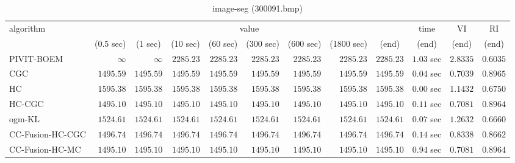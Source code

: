 \begin{table}[H]
\scriptsize
\centering
\caption{image-seg (300091.bmp)}
\label{tab:anytimetable-image-seg-300091.bmp}
\begin{tabular}{lrrrrrrrrrrr}
\toprule
           algorithm &                                   \multicolumn{8}{c}{value} & \multicolumn{1}{c}{time}    & \multicolumn{1}{c}{VI}  & \multicolumn{1}{c}{RI} \\  
\cmidrule(lr){2-9}\cmidrule(lr){10-10} \cmidrule(lr){11-11} \cmidrule(lr){12-12}   
                     & \multicolumn{1}{c}{(0.5 sec)} & \multicolumn{1}{c}{(1 sec)} & \multicolumn{1}{c}{(10 sec)} & \multicolumn{1}{c}{(60 sec)} & \multicolumn{1}{c}{(300 sec)} & \multicolumn{1}{c}{(600 sec)} & \multicolumn{1}{c}{(1800 sec)} & \multicolumn{1}{c}{(end)} & \multicolumn{1}{c}{(end)}    & \multicolumn{1}{c}{(end)}   & \multicolumn{1}{c}{(end)}  \\ \midrule 
          PIVIT-BOEM & $\infty$ & $\infty$ & $      2285.23$ & $      2285.23$ & $      2285.23$ & $      2285.23$ & $      2285.23$ & $      2285.23$ & $         1.03$ sec    & $       2.8335$  & $       0.6035$ \\ 
                 CGC & $      1495.59$ & $      1495.59$ & $      1495.59$ & $      1495.59$ & $      1495.59$ & $      1495.59$ & $      1495.59$ & $      1495.59$ & $         0.04$ sec    & $       0.7039$  & $       0.8965$ \\ 
                  HC & $      1595.38$ & $      1595.38$ & $      1595.38$ & $      1595.38$ & $      1595.38$ & $      1595.38$ & $      1595.38$ & $      1595.38$ & $         0.00$ sec    & $       1.1432$  & $       0.6750$ \\ 
              HC-CGC & $      1495.10$ & $      1495.10$ & $      1495.10$ & $      1495.10$ & $      1495.10$ & $      1495.10$ & $      1495.10$ & $      1495.10$ & $         0.11$ sec    & $       0.7081$  & $       0.8964$ \\ 
              ogm-KL & $      1524.61$ & $      1524.61$ & $      1524.61$ & $      1524.61$ & $      1524.61$ & $      1524.61$ & $      1524.61$ & $      1524.61$ & $         0.07$ sec    & $       1.2632$  & $       0.6660$ \\ 
    CC-Fusion-HC-CGC & $      1496.74$ & $      1496.74$ & $      1496.74$ & $      1496.74$ & $      1496.74$ & $      1496.74$ & $      1496.74$ & $      1496.74$ & $         0.14$ sec    & $       0.8338$  & $       0.8662$ \\ 
     CC-Fusion-HC-MC & $      1495.10$ & $      1495.10$ & $      1495.10$ & $      1495.10$ & $      1495.10$ & $      1495.10$ & $      1495.10$ & $      1495.10$ & $         0.94$ sec    & $       0.7081$  & $       0.8964$ \\ 

\end{tabular}
\end{table}
